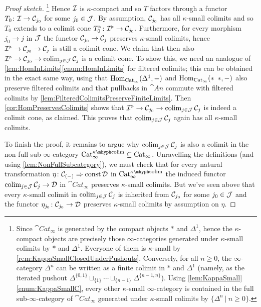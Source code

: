 \begin{proof}[Proof sketch]
	\footnote{Since $\cat{Cat}_\infty$ is generated by the compact objects $*$ and $\Delta^1$, hence the $\kappa$-compact objects are precisely those $\infty$-categories generated under $\kappa$-small colimits by $*$ and $\Delta^1$. Everyone of them is $\kappa$-small by \cref{rem:KappaSmallClosedUnderPushouts}. Conversely, for all $n\geqslant 0$, the $\infty$-category $\Delta^n$ can be written as a finite colimit in $*$ and $\Delta^1$ (namely, as the iterated pushout $\Delta^{\{0,1\}}\sqcup_{\{1\}}\dotsb \sqcup_{\{n-1\}}\Delta^{\{n-1,n\}}$). Using \cref{lem:KappaSmall}\cref{enum:KappaSmallC}, every other $\kappa$-small $\infty$-category is contained in the full sub-$\infty$-category of $\cat{Cat}_\infty$ generated under $\kappa$-small colimits by $\{\Delta^n\ \vert\ n\geqslant 0\}$.}
	Hence $\mathcal{I}$ is $\kappa$-compact and so $T$ factors through a functor $T_0\colon \mathcal{I}\rightarrow \mathcal{C}_{j_0}$ for some $j_0\in\mathcal{J}$. By assumption, $\mathcal{C}_{j_0}$ has all $\kappa$-small colimits and so $T_0$ extends to a colimit cone $T_0^\triangleright\colon \mathcal{I}^\triangleright\rightarrow \mathcal{C}_{j_0}$. Furthermore, for every morphism $j_0\rightarrow j$ in $\mathcal{J}$ the functor $\mathcal{C}_{j_0}\rightarrow \mathcal{C}_j$ preserves $\kappa$-small colimits, hence $\mathcal{I}^\triangleright\rightarrow \mathcal{C}_{j_0}\rightarrow \mathcal{C}_j$ is still a colimit cone. We claim that then also $\mathcal{I}^\triangleright\rightarrow \mathcal{C}_{j_0}\rightarrow \operatorname*{colim}_{j\in \mathcal{J}}\mathcal{C}_j$ is a colimit cone. To show this, we need an analogue of \cref{lem:HomInLimits}\cref{enum:HomInLimits} for filtered colimits; this can be obtained in the exact same way, using that $\operatorname{Hom}_{\mathrm{Cat}_\infty}(\Delta^1,-)$ and $\operatorname{Hom}_{\mathrm{Cat}_\infty}(*\ \,*,-)$ also preserve filtered colimits and that pullbacks in $\cat{An}$ commute with filtered colimits by \cref{lem:FilteredColimitsPreserveFiniteLimits}. Then \cref{cor:HomPreservesColimits} shows that $\mathcal{I}^\triangleright\rightarrow \mathcal{C}_{j_0}\rightarrow \operatorname*{colim}_{j\in \mathcal{J}}\mathcal{C}_j$ is indeed a colimit cone, as claimed. This proves that $\operatorname*{colim}_{j\in \mathcal{J}}\mathcal{C}_j$ again has all $\kappa$-small colimits.
	
	To finish the proof, it remains to argue why $\operatorname*{colim}_{j\in\mathcal{J}}\mathcal{C}_j$ is also a colimit in the non-full sub-$\infty$-category $\cat{Cat}_\infty^{\kappa\mhyph\!\colimit}\subseteq \cat{Cat}_\infty$. Unravelling the definitions (and using \cref{lem:NonFullSubcategory}), we must check that for every natural transformation $\eta\colon \mathcal{C}_{(-)}\Rightarrow \operatorname{const} \mathcal{D}$ in $\cat{Cat}_\infty^{\kappa\mhyph\!\colimit}$ the induced functor $\operatorname*{colim}_{j\in\mathcal{J}}\mathcal{C}_j\rightarrow \mathcal{D}$ in $\cat{Cat}_\infty$ preserves $\kappa$-small colimits. But we've seen above that every $\kappa$-small colimit in $\operatorname*{colim}_{j\in \mathcal{J}}\mathcal{C}_j$ is inherited from $\mathcal{C}_{j_0}$ for some $j_0\in \mathcal{J}$ and the functor $\eta_{j_0}\colon \mathcal{C}_{j_0}\rightarrow \mathcal{D}$ preserves $\kappa$-small colimits by assumption on $\eta$.
\end{proof}

\postsectionappendix
